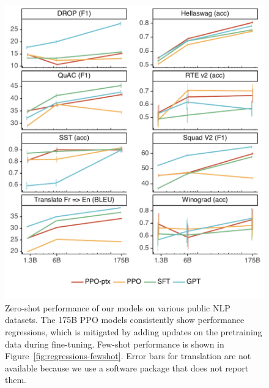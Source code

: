 \documentclass{article}
\begin{document}
\begin{figure}[h]
    \centering
    \includegraphics[width=\linewidth]{figs/academic-zeroshot.pdf}
    \caption{Zero-shot performance of our models on various public NLP datasets. The 175B PPO models consistently show performance regressions, which is mitigated by adding updates on the pretraining data during fine-tuning. Few-shot performance is shown in Figure~\ref{fig:regressions-fewshot}. Error bars for translation are not available because we use a software package that does not report them.}
    \label{fig:regressions-zeroshot}
\end{figure}
\end{document}
